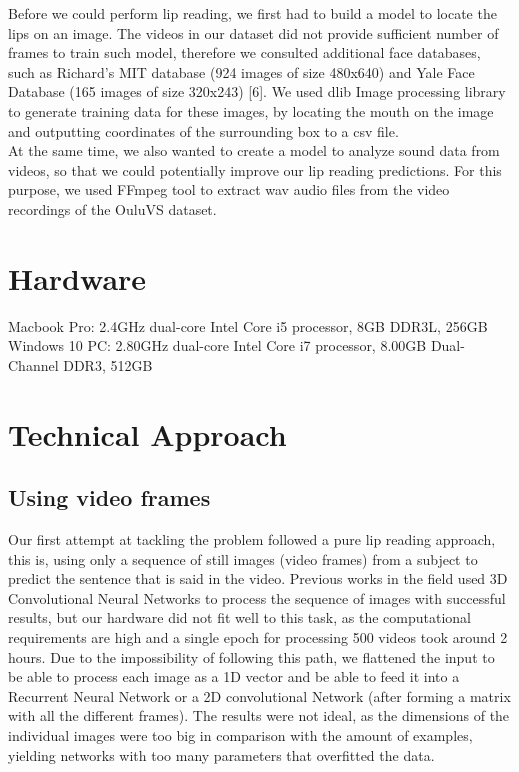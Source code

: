 \documentclass{article}[10pt]
\begin{document}
\begin{multicols}{2}
Before we could perform lip reading, we first had to build a model to locate the
lips on an image. The videos in our dataset did not provide sufficient number of
frames to train such model, therefore we consulted additional face databases, such
as Richard's MIT database (924 images of size 480x640) and Yale Face Database
(165 images of size 320x243) [6]. We used dlib Image processing library to
generate training data for these images, by locating the mouth on the image and
outputting coordinates of the surrounding box to a csv file.\\

At the same time, we also wanted to create a model to analyze sound data from
videos, so that we could potentially improve our lip reading predictions. For
this purpose, we used FFmpeg tool to extract wav audio files from the video
recordings of the OuluVS dataset.

\section{Hardware}
Macbook Pro: 2.4GHz dual-core Intel Core i5 processor, 8GB DDR3L, 256GB\\
Windows 10 PC: 2.80GHz dual-core Intel Core i7 processor, 8.00GB Dual-Channel DDR3, 512GB

\section{Technical Approach}
\subsection{Using video frames}

Our first attempt at tackling the problem followed a pure lip reading approach,
this is, using only a sequence of still images (video frames) from a subject to
predict the sentence that is said in the video. Previous works in the field used
3D Convolutional Neural Networks to process the sequence of images with
successful results, but our hardware did not fit well to this task, as the
computational requirements are high and a single epoch for
processing 500 videos took around 2 hours. Due to the impossibility of following this path, we
flattened the input to be able to process each image as a 1D vector and be able
to feed it into a Recurrent Neural Network or a 2D convolutional Network
(after forming a matrix with all the different frames). The results were not
ideal, as the dimensions of the individual images were too big in comparison with
the amount of examples, yielding networks with too many parameters that
overfitted the data.


\end{multicols}
\end{document}
